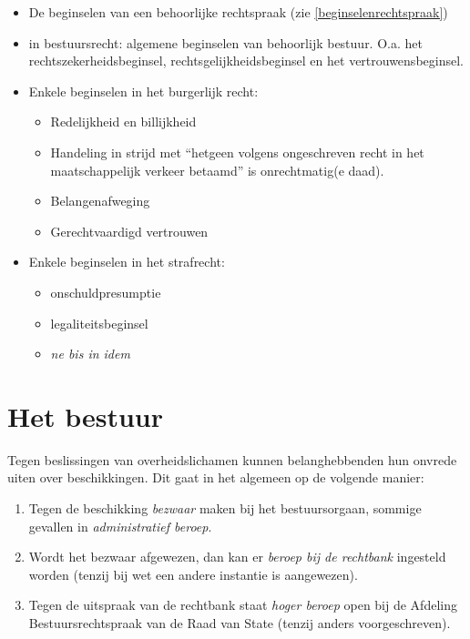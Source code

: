 \documentclass{article}
\begin{document}
\begin{itemize}

  \item De beginselen van een behoorlijke rechtspraak (zie
    \ref{beginselenrechtspraak})

  \item in bestuursrecht: algemene beginselen van behoorlijk bestuur. O.a. het
    rechtszekerheidsbeginsel, rechtsgelijkheidsbeginsel en het vertrouwensbeginsel.

  \item Enkele beginselen in het burgerlijk recht:
    \begin{itemize}
      \item Redelijkheid en billijkheid
      \item Handeling in strijd met ``hetgeen volgens ongeschreven recht in het
        maatschappelijk verkeer betaamd'' is onrechtmatig(e daad).
      \item Belangenafweging
      \item Gerechtvaardigd vertrouwen
    \end{itemize}

  \item Enkele beginselen in het strafrecht:
    \begin{itemize}
      \item onschuldpresumptie
      \item legaliteitsbeginsel
      \item \emph{ne bis in idem}
    \end{itemize}

\end{itemize}

\section{Het bestuur}

Tegen beslissingen van overheidslichamen kunnen belanghebbenden
hun onvrede uiten over beschikkingen. Dit gaat in het algemeen
op de volgende manier:

\begin{enumerate}
  \item Tegen de beschikking \emph{bezwaar} maken bij het bestuursorgaan,
    sommige gevallen in \emph{administratief beroep}.
  \item Wordt het bezwaar afgewezen, dan kan er \emph{beroep bij de rechtbank} 
    ingesteld worden (tenzij bij wet een andere instantie is aangewezen).
  \item Tegen de uitspraak van de rechtbank staat \emph{hoger beroep} open
    bij de Afdeling Bestuursrechtspraak van de Raad van State (tenzij anders
    voorgeschreven).
\end{enumerate}
\end{document}
